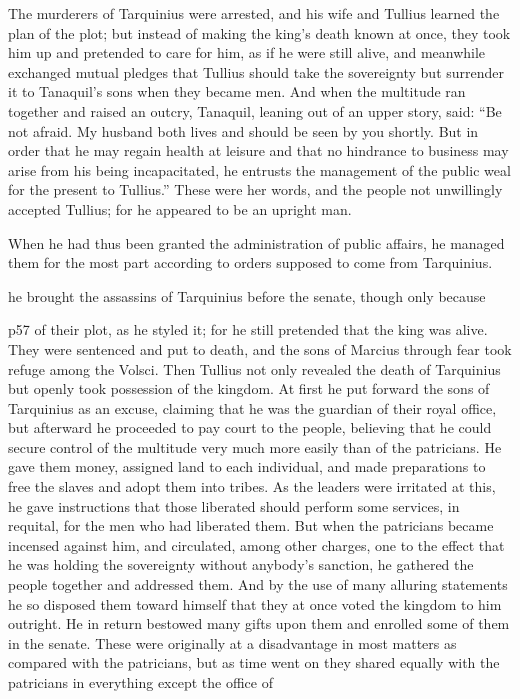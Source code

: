 The murderers of Tarquinius were arrested, and his wife and Tullius learned the plan of the plot; but instead of making the king's death known at once, they took him up and pretended to care for him, as if he were still alive, and meanwhile exchanged mutual pledges that Tullius should take the sovereignty but surrender it to Tanaquil's sons when they became men. And when the multitude ran together and raised an outcry, Tanaquil, leaning out of an upper story, said: ``Be not afraid. My husband both lives and should be seen by you shortly. But in order that he may regain health at leisure and that no hindrance to business may arise from his being incapacitated, he entrusts the management of the public weal for the present to Tullius.'' These were her words, and the people not unwillingly accepted Tullius; for he appeared to be an upright man.

When he had thus been granted the administration of public affairs, he managed them for the most part according to orders supposed to come from Tarquinius.

he brought the assassins of Tarquinius before the senate, though only because

p57 of their plot, as he styled it; for he still pretended that the king was alive. They were sentenced and put to death, and the sons of Marcius through fear took refuge among the Volsci. Then Tullius not only revealed the death of Tarquinius but openly took possession of the kingdom. At first he put forward the sons of Tarquinius as an excuse, claiming that he was the guardian of their royal office, but afterward he proceeded to pay court to the people, believing that he could secure control of the multitude very much more easily than of the patricians. He gave them money, assigned land to each individual, and made preparations to free the slaves and adopt them into tribes. As the leaders were irritated at this, he gave instructions that those liberated should perform some services, in requital, for the men who had liberated them. But when the patricians became incensed against him, and circulated, among other charges, one to the effect that he was holding the sovereignty without anybody's sanction, he gathered the people together and addressed them. And by the use of many alluring statements he so disposed them toward himself that they at once voted the kingdom to him outright. He in return bestowed many gifts upon them and enrolled some of them in the senate. These were originally at a disadvantage in most matters as compared with the patricians, but as time went on they shared equally with the patricians in everything except the office of

